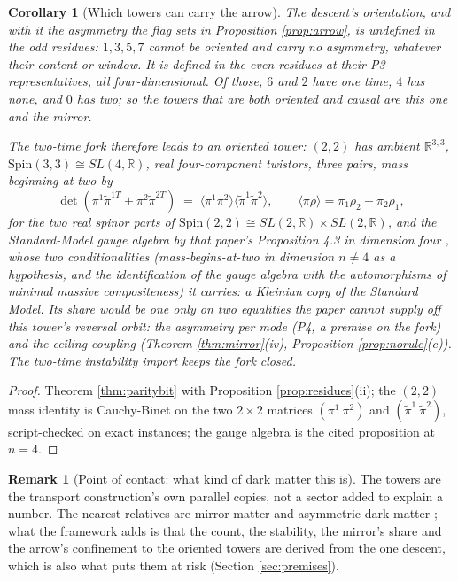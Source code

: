 \documentclass[11pt]{article}
\newtheorem{corollary}[theorem]{Corollary}
\theoremstyle{definition}
\newtheorem{remark}[theorem]{Remark}
\newcommand{\R}{\mathbb{R}}
\newcommand{\br}[1]{\langle #1\rangle}
\begin{document}
\begin{corollary}[Which towers can carry the arrow]\label{cor:whocarries}
The descent's orientation, and with it the asymmetry the flag sets in Proposition \ref{prop:arrow}, is undefined in the odd residues: $1, 3, 5, 7$ cannot be oriented and carry no asymmetry, whatever their content or window. It is defined in the even residues at their P3 representatives, all four-dimensional. Of those, $6$ and $2$ have one time, $4$ has none, and $0$ has two; so the towers that are both oriented and causal are this one and the mirror.

The two-time fork therefore leads to an \emph{oriented} tower: $(2,2)$ has ambient $\R^{3,3}$, $\mathrm{Spin}(3,3) \cong SL(4,\R)$, real four-component twistors, three pairs, mass beginning at two by
\[
\det(\pi^{1}\tilde\pi^{1T} + \pi^{2}\tilde\pi^{2T}) \;=\; \br{\pi^{1}\pi^{2}}\br{\tilde\pi^{1}\tilde\pi^{2}}, \qquad \br{\pi\rho} = \pi_{1}\rho_{2} - \pi_{2}\rho_{1},
\]
for the two real spinor parts of $\mathrm{Spin}(2,2) \cong SL(2,\R) \times SL(2,\R)$, and the Standard-Model gauge algebra by that paper's Proposition 4.3 in dimension four \cite[Prop.~4.3]{ButlerT12}, whose two conditionalities (mass-begins-at-two in dimension $n \neq 4$ as a hypothesis, and the identification of the gauge algebra with the automorphisms of minimal massive compositeness) it carries: a Kleinian copy of the Standard Model. Its share would be one only on two equalities the paper cannot supply off this tower's reversal orbit: the asymmetry per mode (P4, a premise on the fork) and the ceiling coupling (Theorem \ref{thm:mirror}(iv), Proposition \ref{prop:norule}(c)). The two-time instability import keeps the fork closed.
\end{corollary}

\begin{proof}
Theorem \ref{thm:paritybit} with Proposition \ref{prop:residues}(ii); the $(2,2)$ mass identity is Cauchy-Binet on the two $2 \times 2$ matrices $(\pi^{1}\ \pi^{2})$ and $(\tilde\pi^{1}\ \tilde\pi^{2})$, script-checked on exact instances; the gauge algebra is the cited proposition at $n = 4$.
\end{proof}

\begin{remark}[Point of contact: what kind of dark matter this is]\label{rem:whatkind}
The towers are the transport construction's own parallel copies, not a sector added to explain a number. The nearest relatives are mirror matter and asymmetric dark matter \cite{FootMirror2004, Zurek2014}; what the framework adds is that the count, the stability, the mirror's share and the arrow's confinement to the oriented towers are derived from the one descent, which is also what puts them at risk (Section \ref{sec:premises}).
\end{remark}
\end{document}

